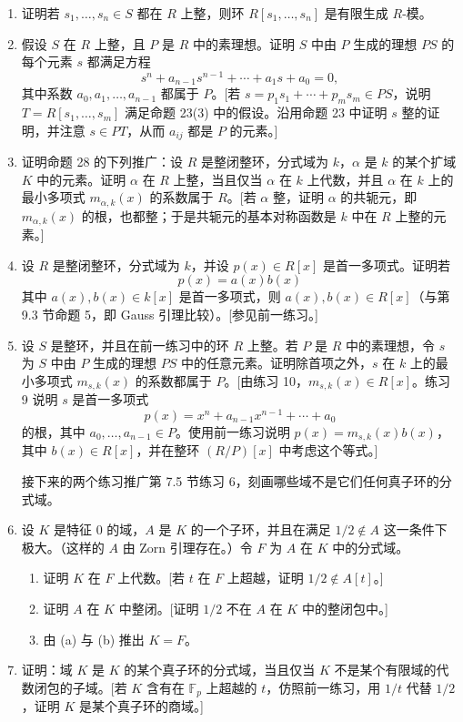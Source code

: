 \begin{enumerate}[label=\arabic*.]
\begin{enumerate}[label=(\alph*)]
	\end{enumerate}
	\item 证明若 $s_1,
	\ldots,s_n\in S$ 都在 $R$ 上整，则环 $R[s_1,
	\ldots,s_n]$ 是有限生成 $R$-模。
	\item 假设 $S$ 在 $R$ 上整，且 $P$ 是 $R$ 中的素理想。证明 $S$ 中由 $P$ 生成的理想 $PS$ 的每个元素 $s$ 都满足方程
	\[
	s^n+a_{n-1}s^{n-1}+\cdots+a_1s+a_0=0,
	\]
	其中系数 $a_0,a_1,
	\ldots,a_{n-1}$ 都属于 $P$。[若 $s=p_1s_1+\cdots+p_ms_m\in PS$，说明 $T=R[s_1,
	\ldots,s_m]$ 满足命题 23(3) 中的假设。沿用命题 23 中证明 $s$ 整的证明，并注意 $s\in PT$，从而 $a_{ij}$ 都是 $P$ 的元素。]
	\item 证明命题 28 的下列推广：设 $R$ 是整闭整环，分式域为 $k$，$\alpha$ 是 $k$ 的某个扩域 $K$ 中的元素。证明 $\alpha$ 在 $R$ 上整，当且仅当 $\alpha$ 在 $k$ 上代数，并且 $\alpha$ 在 $k$ 上的最小多项式 $m_{\alpha,k}(x)$ 的系数属于 $R$。[若 $\alpha$ 整，证明 $\alpha$ 的共轭元，即 $m_{\alpha,k}(x)$ 的根，也都整；于是共轭元的基本对称函数是 $k$ 中在 $R$ 上整的元素。]
	\item 设 $R$ 是整闭整环，分式域为 $k$，并设 $p(x)\in R[x]$ 是首一多项式。证明若
	\[
	p(x)=a(x)b(x)
	\]
	其中 $a(x),b(x)\in k[x]$ 是首一多项式，则 $a(x),b(x)\in R[x]$（与第 9.3 节命题 5，即 Gauss 引理比较）。[参见前一练习。]
	\item 设 $S$ 是整环，并且在前一练习中的环 $R$ 上整。若 $P$ 是 $R$ 中的素理想，令 $s$ 为 $S$ 中由 $P$ 生成的理想 $PS$ 中的任意元素。证明除首项之外，$s$ 在 $k$ 上的最小多项式 $m_{s,k}(x)$ 的系数都属于 $P$。[由练习 10，$m_{s,k}(x)\in R[x]$。练习 9 说明 $s$ 是首一多项式
	\[
	p(x)=x^n+a_{n-1}x^{n-1}+\cdots+a_0
	\]
	的根，其中 $a_0,
	\ldots,a_{n-1}\in P$。使用前一练习说明 $p(x)=m_{s,k}(x)b(x)$，其中 $b(x)\in R[x]$，并在整环 $(R/P)[x]$ 中考虑这个等式。]
	
	接下来的两个练习推广第 7.5 节练习 6，刻画哪些域不是它们任何真子环的分式域。
	
	\item 设 $K$ 是特征 $0$ 的域，$A$ 是 $K$ 的一个子环，并且在满足 $1/2\notin A$ 这一条件下极大。（这样的 $A$ 由 Zorn 引理存在。）令 $F$ 为 $A$ 在 $K$ 中的分式域。
	\begin{enumerate}[label=(\alph*)]
		\item 证明 $K$ 在 $F$ 上代数。[若 $t$ 在 $F$ 上超越，证明 $1/2\notin A[t]$。]
		\item 证明 $A$ 在 $K$ 中整闭。[证明 $1/2$ 不在 $A$ 在 $K$ 中的整闭包中。]
		\item 由 (a) 与 (b) 推出 $K=F$。
	\end{enumerate}
	\item 证明：域 $K$ 是 $K$ 的某个真子环的分式域，当且仅当 $K$ 不是某个有限域的代数闭包的子域。[若 $K$ 含有在 $\mathbb F_p$ 上超越的 $t$，仿照前一练习，用 $1/t$ 代替 $1/2$，证明 $K$ 是某个真子环的商域。]
	

\end{enumerate}
